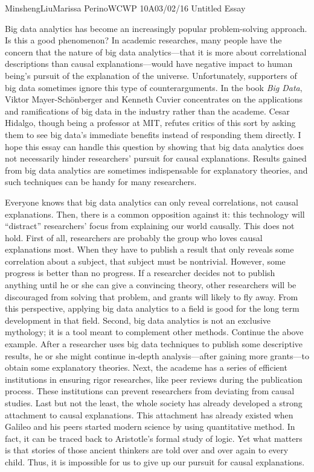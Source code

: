 \documentclass[12pt,letterpaper]{article}
\begin{document}
\begin{mla}{Minsheng}{Liu}{Marissa Perino}{WCWP 10A}{03/02/16}
  {Untitled Essay}

Big data analytics has become an increasingly popular problem-solving
approach. Is this a good phenomenon? In academic researches, many people
have the concern that the nature of big data analytics---that it is more
about correlational descriptions than causal explanations---would have
negative impact to human being's pursuit of the explanation of the
universe. Unfortunately, supporters of big data sometimes ignore this
type of counterarguments. In the book \emph{Big Data}, Viktor
Mayer-Schönberger and Kenneth Cuvier concentrates on the applications
and ramifications of big data in the industry rather than the academe.
Cesar Hidalgo, though being a professor at MIT, refutes critics of this
sort by asking them to see big data's immediate benefits instead of
responding them directly. I hope this essay can handle this question by
showing that big data analytics does not necessarily hinder researchers'
pursuit for causal explanations. Results gained from big data analytics
are sometimes indispensable for explanatory theories, and such
techniques can be handy for many researchers.

Everyone knows that big data analytics can only reveal correlations, not
causal explanations. Then, there is a common opposition against it: this
technology will ``distract'' researchers' focus from explaining our
world causally. This does not hold. First of all, researchers are
probably the group who loves causal explanations most. When they have to
publish a result that only reveals some correlation about a subject,
that subject must be nontrivial. However, some progress is better than
no progress. If a researcher decides not to publish anything until he or
she can give a convincing theory, other researchers will be discouraged
from solving that problem, and grants will likely to fly away. From this
perspective, applying big data analytics to a field is good for the long
term development in that field. Second, big data analytics is not an
exclusive mythology; it is a tool meant to complement other methods.
Continue the above example. After a researcher uses big data techniques
to publish some descriptive results, he or she might continue in-depth
analysis---after gaining more grants---to obtain some explanatory
theories. Next, the academe has a series of efficient institutions in
ensuring rigor researches, like peer reviews during the publication
process. These institutions can prevent researchers from deviating from
causal studies. Last but not the least, the whole society has already
developed a strong attachment to causal explanations. This attachment
has already existed when Galileo and his peers started modern science by
using quantitative method. In fact, it can be traced back to Aristotle's
formal study of logic. Yet what matters is that stories of those ancient
thinkers are told over and over again to every child. Thus, it is
impossible for us to give up our pursuit for causal explanations.


\end{mla}
\end{document}
